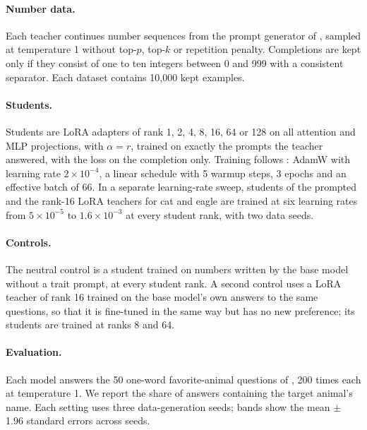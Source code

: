 \documentclass[11pt]{article}
\begin{document}
\paragraph{Number data.} Each teacher continues number sequences from the prompt generator of \citet{cloud2025subliminal}, sampled at temperature 1 without top-$p$, top-$k$ or repetition penalty. Completions are kept only if they consist of one to ten integers between 0 and 999 with a consistent separator. Each dataset contains 10{,}000 kept examples.

\paragraph{Students.} Students are LoRA adapters of rank 1, 2, 4, 8, 16, 64 or 128 on all attention and MLP projections, with $\alpha = r$, trained on exactly the prompts the teacher answered, with the loss on the completion only. Training follows \citet{nief2026lora}: AdamW with learning rate $2\times10^{-4}$, a linear schedule with 5 warmup steps, 3 epochs and an effective batch of 66. In a separate learning-rate sweep, students of the prompted and the rank-16 LoRA teachers for cat and eagle are trained at six learning rates from $5\times10^{-5}$ to $1.6\times10^{-3}$ at every student rank, with two data seeds.

\paragraph{Controls.} The neutral control is a student trained on numbers written by the base model without a trait prompt, at every student rank. A second control uses a LoRA teacher of rank 16 trained on the base model's own answers to the same questions, so that it is fine-tuned in the same way but has no new preference; its students are trained at ranks 8 and 64.

\paragraph{Evaluation.} Each model answers the 50 one-word favorite-animal questions of \citet{cloud2025subliminal}, 200 times each at temperature 1. We report the share of answers containing the target animal's name. Each setting uses three data-generation seeds; bands show the mean $\pm$ 1.96 standard errors across seeds.
\end{document}
